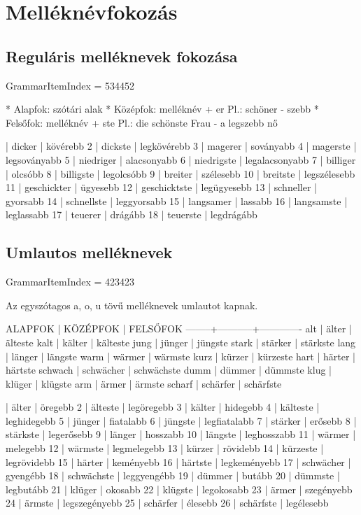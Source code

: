 \documentclass{article}
\newenvironment{desc}{\verbatim}{\endverbatim}
\newenvironment{exmp}{\verbatim}{\endverbatim}
\begin{document}
\section{Melléknévfokozás}

\subsection{Reguláris melléknevek fokozása}

GrammarItemIndex = 534452

\begin{desc}
* Alapfok: szótári alak
* Középfok: melléknév + er
  Pl.: schöner - szebb
* Felsőfok: melléknév + ste
  Pl.: die schönste Frau - a legszebb nő
\end{desc}

\begin{exmp}
1 | dicker | kövérebb
2 | dickste | legkövérebb
3 | magerer | soványabb
4 | magerste | legsoványabb
5 | niedriger | alacsonyabb
6 | niedrigste | legalacsonyabb
7 | billiger | olcsóbb
8 | billigste | legolcsóbb
9 | breiter | szélesebb
10 | breitste | legszélesebb
11 | geschickter | ügyesebb
12 | geschicktste | legügyesebb
13 | schneller | gyorsabb
14 | schnellste | leggyorsabb
15 | langsamer | lassabb
16 | langsamste | leglassabb
17 | teuerer | drágább
18 | teuerste | legdrágább
\end{exmp}

\subsection{Umlautos melléknevek}

GrammarItemIndex = 423423

\begin{desc}
Az egyszótagos a, o, u tövű melléknevek umlautot kapnak.

ALAPFOK | KÖZÉPFOK  | FELSŐFOK
--------+-----------+-------------
alt     | älter     | älteste
kalt    | kälter    | kälteste
jung    | jünger    | jüngste
stark   | stärker   | stärkste
lang    | länger    | längste
warm    | wärmer    | wärmste
kurz    | kürzer    | kürzeste
hart    | härter    | härtste
schwach | schwächer | schwächste
dumm    | dümmer    | dümmste
klug    | klüger    | klügste
arm     | ärmer     | ärmste
scharf  | schärfer  | schärfste
\end{desc}

\begin{exmp}
1 | älter | öregebb
2 | älteste | legöregebb
3 | kälter | hidegebb
4 | kälteste | leghidegebb
5 | jünger | fiatalabb
6 | jüngste | legfiatalabb
7 | stärker | erősebb
8 | stärkste | legerősebb
9 | länger | hosszabb
10 | längste | leghosszabb
11 | wärmer | melegebb
12 | wärmste | legmelegebb
13 | kürzer | rövidebb
14 | kürzeste | legrövidebb
15 | härter | keményebb
16 | härtste | legkeményebb
17 | schwächer | gyengébb
18 | schwächste | leggyengébb
19 | dümmer | butább
20 | dümmste | legbutább
21 | klüger | okosabb
22 | klügste | legokosabb
23 | ärmer | szegényebb
24 | ärmste | legszegényebb
25 | schärfer | élesebb
26 | schärfste | legélesebb
\end{exmp}
\end{document}
